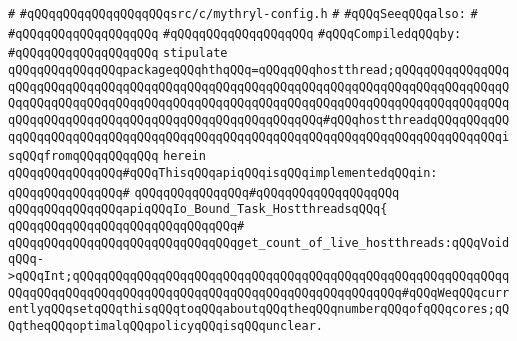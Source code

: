 \verb|#|\newline
\verb|#qQQqqQQqqQQqqQQqqQQqsrc/c/mythryl-config.h|\newline
\verb|#|\newline
\verb|#qQQqSeeqQQqalso:|\newline
\verb|#|\newline
\verb|#qQQqqQQqqQQqqQQqqQQq|\newline
\verb|#qQQqqQQqqQQqqQQqqQQq|\newline
\newline
\verb|#qQQqCompiledqQQqby:|\newline
\verb|#qQQqqQQqqQQqqQQqqQQq|\newline
\newline
\newline
\verb|stipulate|\newline
\verb|qQQqqQQqqQQqqQQqpackageqQQqhthqQQq=qQQqqQQqhostthread;qQQqqQQqqQQqqQQqqQQqqQQqqQQqqQQqqQQqqQQqqQQqqQQqqQQqqQQqqQQqqQQqqQQqqQQqqQQqqQQqqQQqqQQqqQQqqQQqqQQqqQQqqQQqqQQqqQQqqQQqqQQqqQQqqQQqqQQqqQQqqQQqqQQqqQQqqQQqqQQqqQQqqQQqqQQqqQQqqQQqqQQqqQQqqQQqqQQqqQQq#qQQqhostthreadqQQqqQQqqQQqqQQqqQQqqQQqqQQqqQQqqQQqqQQqqQQqqQQqqQQqqQQqqQQqqQQqqQQqqQQqqQQqqQQqisqQQqfromqQQqqQQqqQQq|\newline
\verb|herein|\newline
\newline
\verb|qQQqqQQqqQQqqQQq#qQQqThisqQQqapiqQQqisqQQqimplementedqQQqin:|\newline
\verb|qQQqqQQqqQQqqQQq#|\newline
\verb|qQQqqQQqqQQqqQQq#qQQqqQQqqQQqqQQqqQQq|\newline
\newline
\verb|qQQqqQQqqQQqqQQqapiqQQqIo_Bound_Task_HostthreadsqQQq{|\newline
\verb|qQQqqQQqqQQqqQQqqQQqqQQqqQQqqQQq#|\newline
\verb|qQQqqQQqqQQqqQQqqQQqqQQqqQQqqQQqget_count_of_live_hostthreads:qQQqVoidqQQq->qQQqInt;qQQqqQQqqQQqqQQqqQQqqQQqqQQqqQQqqQQqqQQqqQQqqQQqqQQqqQQqqQQqqQQqqQQqqQQqqQQqqQQqqQQqqQQqqQQqqQQqqQQqqQQqqQQqqQQqqQQq#qQQqWeqQQqcurrentlyqQQqsetqQQqthisqQQqtoqQQqaboutqQQqtheqQQqnumberqQQqofqQQqcores;qQQqtheqQQqoptimalqQQqpolicyqQQqisqQQqunclear.|\newline
